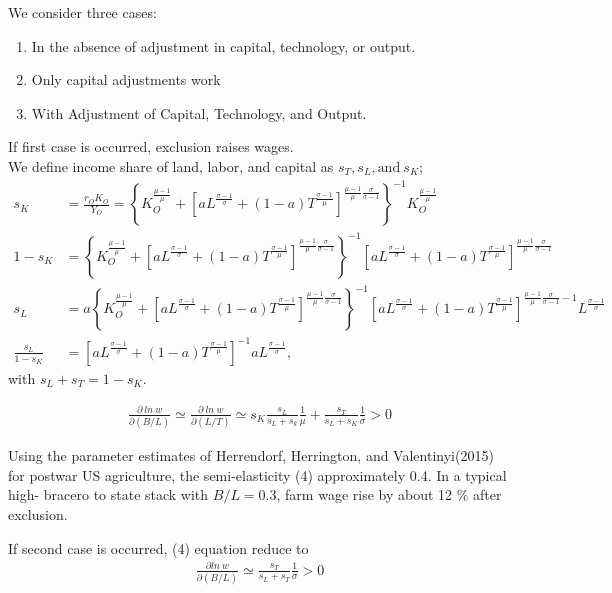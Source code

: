 \documentclass[../root]{subfiles}
\begin{document}
    We consider three cases:
    \begin{enumerate}
        \item In the absence of adjustment in capital, technology, or output.
        \item Only capital adjustments work
        \item With Adjustment of Capital, Technology, and Output.
    \end{enumerate}
    If first case is occurred, exclusion raises wages. \\
    We define income share of land, labor, and capital as $s_T, s_L, \mbox{and} \ s_K$;
    \begin{align*}
        s_K&= \frac{r_O K_O}{Y_O} = \left\{K_O^{\frac{\mu -1}{\mu}}+\left[a L^{\frac{\sigma -1}{\sigma}}+(1-a)T^{\frac{\sigma -1}{\mu}}\right]^{\frac{\mu-1}{\mu}\frac{\sigma}{\sigma-1}} \right\}^{-1} K_O^{\frac{\mu-1}{\mu}} \\
        1-s_K&=  \left\{K_O^{\frac{\mu -1}{\mu}}+\left[a L^{\frac{\sigma -1}{\sigma}}+(1-a)T^{\frac{\sigma -1}{\mu}}\right]^{\frac{\mu-1}{\mu}\frac{\sigma}{\sigma-1}} \right\}^{-1}\left[a L^{\frac{\sigma -1}{\sigma}}+(1-a)T^{\frac{\sigma -1}{\mu}}\right]^{\frac{\mu-1}{\mu}\frac{\sigma}{\sigma-1}} \\
        s_L&=a\left\{K_O^{\frac{\mu -1}{\mu}}+\left[a L^{\frac{\sigma -1}{\sigma}}+(1-a)T^{\frac{\sigma -1}{\mu}}\right]^{\frac{\mu-1}{\mu}\frac{\sigma}{\sigma-1}} \right\}^{-1}\left[a L^{\frac{\sigma -1}{\sigma}}+(1-a)T^{\frac{\sigma -1}{\mu}}\right]^{\frac{\mu-1}{\mu}\frac{\sigma}{\sigma-1}-1} L^{\frac{\sigma-1}{\sigma}} \\
        \frac{s_L}{1-s_K}&=\left[a L^{\frac{\sigma -1}{\sigma}}+(1-a)T^{\frac{\sigma -1}{\mu}}\right]^{-1} aL^{\frac{\sigma-1}{\sigma}},
    \end{align*}
    with $s_L+s_T=1-s_K$.
    
    \begin{align}
        \frac{\partial \ ln \ w}{\partial (B/L)} \simeq \frac{\partial \ ln \  w}{\partial (L/T)} \simeq s_K\frac{s_L}{s_L+s_k}\frac{1}{\mu} + \frac{s_T}{s_L+s_K} \frac{1}{\sigma} >0
    \end{align}
    
    Using the parameter estimates of Herrendorf, Herrington, and Valentinyi(2015) for postwar US agriculture, the semi-elasticity (4) approximately 0.4.  In a typical high- bracero to state stack with $B/L=0.3$, farm wage rise by about 12 \% after exclusion. 
    
    If second case is occurred, (4) equation reduce to 
    \begin{align}
        \frac{\partial ln \ w}{\partial (B/L)} \simeq \frac{s_T}{s_L+s_T} \frac{1}{\sigma} >0
    \end{align}
    
\end{document}
